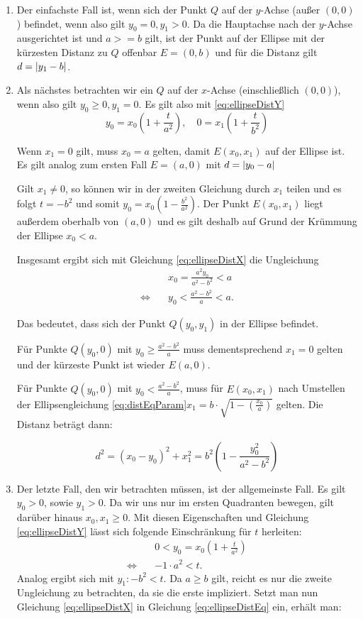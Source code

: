 \begin{enumerate}
	\item Der einfachste Fall ist, wenn sich der Punkt $Q$ auf der $y$-Achse (außer $(0,0)$) befindet, wenn also gilt $y_0 = 0, y_1 > 0$.
	Da die Hauptachse nach der $y$-Achse ausgerichtet ist und $a >= b$ gilt, ist der Punkt auf der Ellipse mit der kürzesten Distanz zu $Q$ offenbar $E = (0, b)$ und für die Distanz gilt $d = \lvert y_1 - b\rvert$.
	\item Als nächstes betrachten wir ein $Q$ auf der $x$-Achse (einschließlich $(0,0)$), wenn also gilt  $y_0 \geq 0, y_1 = 0$. Es gilt also mit \ref{eq:ellipseDistY}
	\[
		y_0 = x_0\left(1 + \frac{t}{a^2}\right), \quad 0 = x_1\left(1 + \frac{t}{b^2}\right)
	\]
	
	Wenn $x_1 = 0$ gilt, muss $x_0 = a$ gelten, damit $E(x_0,x_1)$ auf der Ellipse ist. Es  gilt analog zum ersten Fall $E=(a,0)$ mit $d = \lvert y_0 - a\rvert$ 
	
	Gilt $x_1 \neq 0$, so können wir in der zweiten Gleichung durch $x_1$ teilen und es folgt $t = -b^2$ und somit $y_0 = x_0\left(1 - \frac{b^2}{a^2}\right)$. Der Punkt $E(x_0,x_1)$ liegt außerdem oberhalb von $(a,0)$ und es gilt deshalb auf Grund der Krümmung der Ellipse $x_0 < a$.
	
	Insgesamt ergibt sich mit Gleichung \ref{eq:ellipseDistX} die Ungleichung
	\[
	\begin{aligned}
		&x_0 = \frac{a^2y_0}{a^2 - b^2} < a \\
		\Leftrightarrow\quad &y_0 < \frac{a^2 - b^2}{a} < a.
	\end{aligned}
	\]
	
	Das bedeutet, dass sich der Punkt $Q(y_0,y_1)$ in der Ellipse befindet. 
		
	Für Punkte $Q(y_0,0)$ mit $y_0 \geq \frac{a^2 - b^2}{a}$ muss dementsprechend $x_1 = 0$ gelten und der kürzeste Punkt ist wieder $E(a,0)$.
	
	Für Punkte $Q(y_0,0)$ mit $y_0 < \frac{a^2 - b^2}{a}$, muss für $E(x_0,x_1)$ nach Umstellen der Ellipsengleichung \ref{eq:distEqParam}\quad$x_1 = b\cdot\sqrt{1-\left(\frac{x_0}{a}\right)}$ gelten. 
	Die Distanz beträgt dann:

	\[
		d^2 = (x_0 - y_0)^2 + x_1^2 = b^2\left(1 - \frac{y_0^2}{a^2 - b^2}\right)
	\]
	\item Der letzte Fall, den wir betrachten müssen, ist der allgemeinste Fall. Es gilt $y_0 > 0$, sowie $y_1 > 0$. Da wir uns nur im ersten Quadranten bewegen, gilt darüber hinaus $x_0, x_1 \geq 0$. Mit diesen Eigenschaften und Gleichung \ref{eq:ellipseDistY} lässt sich folgende Einschränkung für $t$ herleiten:
\[
	\begin{aligned}
	& 0 < y_0 = x_0\left(1 + \frac{t}{a^2}\right)\\
	\Leftrightarrow\quad& -1\cdot a^2 < t.
	\end{aligned}
\]
	Analog ergibt sich mit $y_1\colon -b^2 < t$. Da $a\geq b$ gilt, reicht es nur die zweite Ungleichung zu betrachten, da sie die erste impliziert. Setzt man nun Gleichung \ref{eq:ellipseDistX} in Gleichung \ref{eq:ellipseDistEq} ein, erhält man:
	

\end{enumerate}
